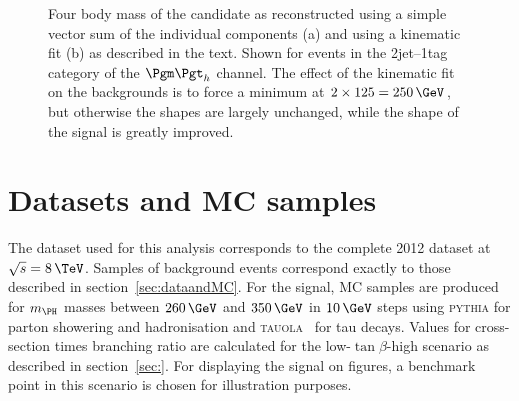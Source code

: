 \begin{figure}
\begin{center}

\end{center}
\caption[Four body mass of the candidate \PH in data and MC events reconstructed
with and without a kinematic fit.]{
Four body mass of the candidate \PH as reconstructed using a simple vector sum of the
individual components (a) and using a kinematic fit (b) as
described in the text. Shown for events in the 2jet--1tag category of the
$\mutau$ channel. The effect of the kinematic fit on the backgrounds is to force
a minimum at $2\times125=250\,\GeV$, but otherwise the shapes are largely
unchanged, while the shape of the signal is greatly improved.}
\label{fig:kinfitvsmttbbstacked}
\end{figure} 

\section{Datasets and MC samples}
\label{sec:Hhhdatasets}

The dataset used for this analysis corresponds to the complete 2012 dataset at
$\sqrt{s}=8\,\TeV$. Samples of background events correspond exactly to those
described in section~\ref{sec:dataandMC}. For the signal, \ac{MC} samples are
produced for $m_{\PH}$ masses between $260\,\GeV$ and $350\,\GeV$ in $10\,\GeV$
steps using \textsc{pythia}
for parton showering and hadronisation and \textsc{tauola}~\cite{TAUOLA} for tau
decays. Values for cross-section times branching ratio are calculated for the
low-$\tan\beta$-high scenario as described in section~\ref{sec:}.
For displaying the signal on figures, a benchmark point in this scenario is
chosen for illustration purposes.

